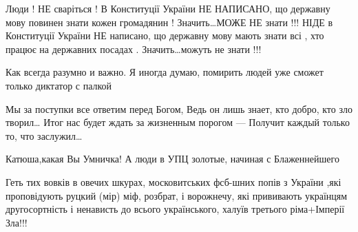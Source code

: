 \begin{itemize}
Люди ! НЕ сваріться ! В Конституції України НЕ НАПИСАНО, що державну мову
повинен знати кожен громадянин ! Значить…МОЖЕ НЕ знати !!! НІДЕ в Конституції
України НЕ написано, що державну мову мають знати всі , хто працює на державних
посадах . Значить…можуть не знати !!!

Как всегда разумно и важно.
Я иногда думаю, помирить людей уже сможет только диктатор с палкой

Мы за поступки все ответим перед Богом,
Ведь он лишь знает, кто добро, кто зло творил…
Итог нас будет ждать за жизненным порогом —
Получит каждый только то, что заслужил…

Катюша,какая Вы Умничка!
А люди в УПЦ золотые, начиная с Блаженнейшего

Геть тих вовків в овечих шкурах, московитських фсб-шних попів з України ,які
проповідують руцкий (мір) міф, розбрат, і ворожнечу, які прививають українцям
другосортність і ненависть до всього українського, халуїв третього ріма+Імперії
Зла!!!
\end{itemize}
